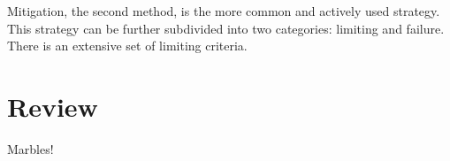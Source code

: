 Mitigation, the second method, is the more common and actively used strategy.
This strategy can be further subdivided into two categories: limiting and failure.
There is an extensive set of limiting criteria.
\section{Review}
\label{sect:review}
Marbles!
